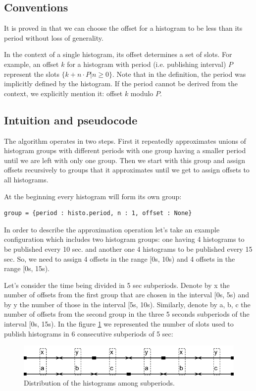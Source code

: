 \subsection*{Conventions}

It is proved in \citep{goossens2003scheduling} that we can choose the offset for a histogram to be less than its period without loss of generality. 

In the context of a single histogram, its offset determines a set of slots. For example, an offset $k$ for a histogram with period (i.e. publishing interval) $P$ represent the slots $\{k+n\cdot P | n \geq 0\}$. Note that in the definition, the period was implicitly defined by the histogram. If the period cannot be derived from the context, we explicitly mention it: offset $k$ modulo $P$.

\subsection*{Intuition and pseudocode}

The algorithm operates in two steps. First it repeatedly approximates unions of histogram groups with different periods with one group having a smaller period until we are left with only one group. Then we start with this group and assign offsets recursively to groups that it approximates until we get to assign offsets to all histograms.

At the beginning every histogram will form its own group:
\begin{verbatim}
group = {period : histo.period, n : 1, offset : None}
\end{verbatim}
In order to describe the approximation operation let’s take an example configuration which includes two histogram groups: one having 4 histograms to be published every 10 sec. and another one 4 histograms to be published every 15 sec. So, we need to assign 4 offsets in the range [0s, 10s) and 4 offsets in the range [0s, 15s).
 
Let’s consider the time being divided in 5 sec subperiods. Denote by x the number of offsets from the first group that are chosen in the interval [0s, 5s) and by y the number of those in the interval [5s, 10s). Similarly, denote by a, b, c the number of offsets from the second group in the three 5 seconds subperiods of the interval [0s, 15s). In the figure \ref{fig:subperiod} we represented the number of slots used to publish histograms in 6 consecutive subperiods of 5 sec:

\begin{figure}[ht!]
\centering
\includegraphics[scale=0.6]{Images/subperiod.png}
\caption{Distribution of the histograms among subperiods.}
\label{fig:subperiod}
\end{figure}

